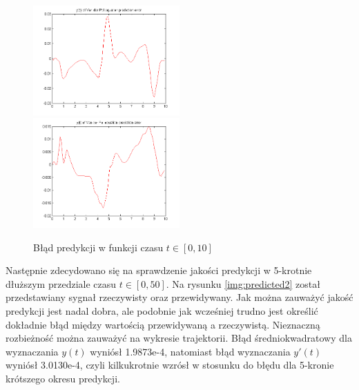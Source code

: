 \begin{figure}[ht!]
	\centering

	\subfloat
	{\includegraphics[width=0.5\textwidth]
	{images/err100_x1.png}}
	\subfloat
	{\includegraphics[width=0.5\textwidth]
	{images/err100_x2.png}}	
	

	\caption{Błąd predykcji w funkcji czasu $t \in [0,10]$}
	\label{img:err100_x}
\end{figure}


Następnie zdecydowano się na sprawdzenie jakości predykcji w 5-krotnie dłuższym przedziale czasu $t \in [0, 50]$. Na rysunku \ref{img:predicted2} został przedstawiany sygnał rzeczywisty oraz przewidywany. Jak można zauważyć jakość predykcji jest nadal dobra, ale podobnie jak wcześniej trudno jest określić dokładnie błąd między wartością przewidywaną a rzeczywistą. Nieznaczną rozbieżność można zauważyć na wykresie trajektorii. Błąd średniokwadratowy dla wyznaczania $y(t)$ wyniósł  1.9873e-4, natomiast błąd wyznaczania $y'(t)$ wyniósł 3.0130e-4, czyli kilkukrotnie wzrósł w stosunku do błędu dla 5-kronie krótszego okresu predykcji.

